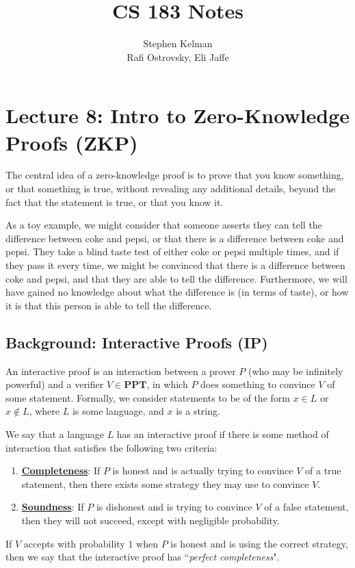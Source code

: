 \documentclass[11pt]{article}
\title{CS 183 Notes}
\author{Stephen Kelman\\ Rafi Ostrovsky, Eli Jaffe}
\newcommand{\PPT}{\mathbf{PPT}}
\begin{document}
\section{Lecture 8: Intro to Zero-Knowledge Proofs (ZKP)}
The central idea of a zero-knowledge proof is to prove that you know something, or that something is true, without revealing any additional details, beyond the fact that the statement is true, or that you know it.\medskip

As a toy example, we might consider that someone asserts they can tell the difference between coke and pepsi, or that there is a difference between coke and pepsi. They take a blind taste test of either coke or pepsi multiple times, and if they pass it every time, we might be convinced that there is a difference between coke and pepsi, and that they are able to tell the difference. Furthermore, we will have gained no knowledge about what the difference is (in terms of taste), or how it is that this person is able to tell the difference.

\subsection{Background: Interactive Proofs (IP)}
An interactive proof is an interaction between a prover \(P\) (who may be infinitely powerful) and a verifier \(V\in\PPT\), in which \(P\) does something to convince \(V\) of some statement. Formally, we consider statements to be of the form \(x\in L\) or \(x\notin L\), where \(L\) is some language, and \(x\) is a string.\medskip

We say that a language \(L\) has an interactive proof if there is some method of interaction that satisfies the following two criteria:
\begin{enumerate}
\item \textbf{\underline{Completeness}}: If \(P\) is honest and is actually trying to convince \(V\) of a true statement, then there exists some strategy they may use to convince \(V\). 
\item \textbf{\underline{Soundness}}: If \(P\) is dishonest and is trying to convince \(V\) of a false statement, then they will not succeed, except with negligible probability.
\end{enumerate}

If \(V\) accepts with probability \(1\) when \(P\) is honest and is using the correct strategy, then we say that the interactive proof has ``\emph{perfect completeness}". \smallskip
\end{document}
